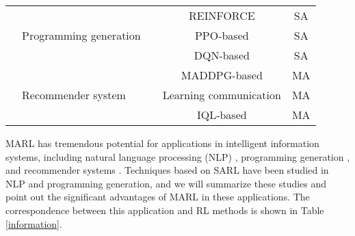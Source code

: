 \documentclass[acmsmall]{acmart}
\begin{document}
\begin{table}[]
\begin{tabularx}{\textwidth}{|XX|c|c|c|}
\multicolumn{1}{|X|}{}                                                 & \multirow{3}{=}{\centering Programming   generation}      & \cite{NEURIPS2022_8636419d}                                     & REINFORCE \cite{REINFORCE}                               & SA       \\ \cline{3-5} 
\multicolumn{1}{|X|}{}                                                 &                                                & \cite{shojaee2023execution}                                     & PPO-based \cite{ppo}                                     & SA       \\ \cline{3-5} 
\multicolumn{1}{|X|}{}                                                 &                                                & \cite{ESNAASHARI2021115446}                                     & DQN-based \cite{dqn}                                     & SA       \\ \cline{2-5} 
\multicolumn{1}{|X|}{}                                                 & \multirow{3}{=}{\centering Recommender system}            & \cite{10.1145/3383313.3412233,10.1145/3269206.3272021,10016386} & MADDPG-based \cite{maddpg}                               & MA       \\ \cline{3-5} 
\multicolumn{1}{|X|}{}                                                 &                                                & \cite{10.1145/3109859.3109914}                                  & Learning communication                                   & MA       \\ \cline{3-5} 
\multicolumn{1}{|X|}{}                                                 &                                                & \cite{10.1145/3331184.3331237}                                  & IQL-based \cite{iql}                                     & MA       \\ \hline
\end{tabularx}
\end{table}
MARL has tremendous potential for applications in intelligent information systems, including natural language processing (NLP) \cite{Uc-Cetina2023, li2016deep, 9025776, Lu_Zhang_Chen_2019, chen-etal-2017-line, SU201824, 8801910, li2017paraphrase}, programming generation \cite{li2017paraphrase, shojaee2023execution, ESNAASHARI2021115446}, and recommender systems \cite{10.1145/3383313.3412233, 10.1145/3109859.3109914, 10.1145/3331184.3331237, 10.1145/3269206.3272021, 10016386}. Techniques based on SARL have been studied in NLP and programming generation, and we will summarize these studies and point out the significant advantages of MARL in these applications. The correspondence between this application and RL methods is shown in Table \ref{information}.
\end{document}
